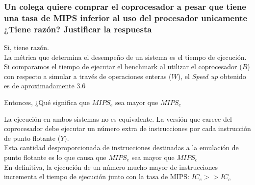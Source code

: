 \documentclass{beamer}
\begin{document}
\begin{frame}
\frametitle{Un colega quiere comprar el coprocesador a pesar que tiene una tasa de MIPS inferior al uso del procesador
unicamente ¿Tiene razón? Justificar la respuesta}

Si, tiene razón.\\
\medskip
La métrica que determina el desempeño de un sistema es el tiempo de ejecución. Si comparamos el tiempo de ejecutar
el benchmark al utilizar el coprocesador ($B$) con respecto a simular a través de operaciones enteras ($W$), el 
\textit{Speed up} obtenido es de aproximadamente $3.6$\footnotemark

\bigskip
Entonces, ¿Qué significa que $MIPS_{e}$ sea mayor que $MIPS_{c}$
%
\end{frame}

\begin{frame}

La ejecución en ambos sistemas no es equivalente. La versión que carece del coprocesador debe ejecutar un número extra
de instrucciones por cada instrucción de punto flotante ($Y$).\\ 
\medskip
Esta cantidad desproporcionada de instrucciones destinadas a la emulación de punto flotante es lo que causa que 
$MIPS_{e}$ sea mayor que $MIPS_{c}$\\
\medskip
En definitiva, la ejecución de un número mucho mayor de instrucciones incrementa el tiempo de ejecución junto con
la tasa de MIPS: $IC_{e} >> IC_{c} $
\end{frame}
%
\end{document}
